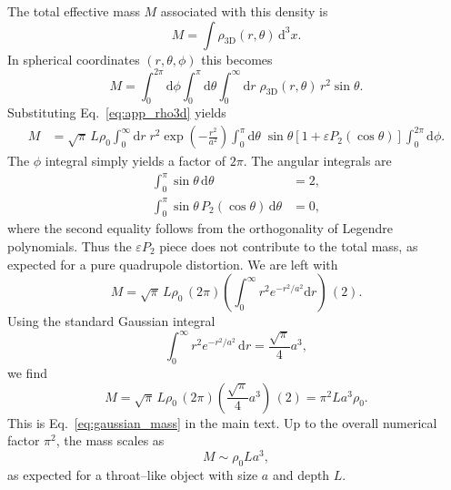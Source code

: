 \documentclass[12pt]{article}
\begin{document}
The total effective mass $M$ associated with this density is
\begin{equation}
  M
  = \int \rho_{\mathrm{3D}}(r,\theta)\,\mathrm{d}^3x.
\end{equation}
In spherical coordinates $(r,\theta,\phi)$ this becomes
\begin{equation}
  M
  = \int_0^{2\pi}\!\mathrm{d}\phi
    \int_0^{\pi}\!\mathrm{d}\theta
    \int_0^{\infty}\!\mathrm{d}r\;
      \rho_{\mathrm{3D}}(r,\theta)\,
      r^2\sin\theta.
\end{equation}
Substituting Eq.~\eqref{eq:app_rho3d} yields
\begin{align}
  M
  &= \sqrt{\pi}\,L\rho_0
     \int_0^{\infty}\!\mathrm{d}r\;
       r^2 \exp\!\left(-\frac{r^2}{a^2}\right)
     \int_0^{\pi}\!\mathrm{d}\theta\;
       \sin\theta
       \left[1 + \varepsilon P_2(\cos\theta)\right]
     \int_0^{2\pi}\!\mathrm{d}\phi.
\end{align}
The $\phi$ integral simply yields a factor of $2\pi$.  The angular integrals
are
\begin{align}
  \int_0^{\pi}\sin\theta\,\mathrm{d}\theta
  &= 2,
  \\
  \int_0^{\pi}\sin\theta\,P_2(\cos\theta)\,\mathrm{d}\theta
  &= 0,
\end{align}
where the second equality follows from the orthogonality of Legendre
polynomials.  Thus the $\varepsilon P_2$ piece does not contribute to the
total mass, as expected for a pure quadrupole distortion.  We are left with
\begin{equation}
  M
  = \sqrt{\pi}\,L\rho_0\,(2\pi)
    \left(\int_0^{\infty}
            r^2 e^{-r^2/a^2}\mathrm{d}r
    \right)\,(2).
\end{equation}
Using the standard Gaussian integral
\begin{equation}
  \int_0^{\infty} r^2 e^{-r^2/a^2}\,\mathrm{d}r
  = \frac{\sqrt{\pi}}{4}a^3,
\end{equation}
we find
\begin{equation}
  M
  = \sqrt{\pi}\,L\rho_0\,(2\pi)
    \left(\frac{\sqrt{\pi}}{4}a^3\right)\,(2)
  = \pi^2 L a^3 \rho_0.
  \label{eq:app_mass_result}
\end{equation}
This is Eq.~\eqref{eq:gaussian_mass} in the main text.  Up to the overall
numerical factor $\pi^2$, the mass scales as
\begin{equation}
  M \sim \rho_0 L a^3,
\end{equation}
as expected for a throat--like object with size $a$ and depth $L$.
\end{document}

